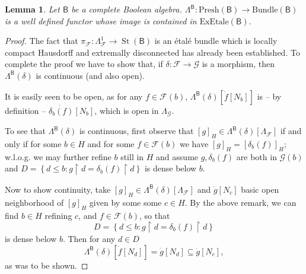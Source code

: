 \documentclass[11pt]{amsart}
\newcommand{\F}{\mathcal{F}}
\newcommand{\G}{\mathcal{G}}
\newcommand{\Presh}{\textrm{Presh}}
\newcommand{\bundle}{\textrm{Bundle}}
\newcommand{\exetale}{\textrm{ExEtale}}
\theoremstyle{plain}
\newtheorem{lemma}[theorem]{Lemma}
\theoremstyle{definition}
\theoremstyle{plain}
\theoremstyle{remark}
\newcommand{\dSet}{\mathsf{Set}}
\DeclareMathOperator{\St}{St}
\newcommand{\bool}[1]{\mathsf{#1}}
\newcommand{\bp}[1]{\left\lbrace #1 \right\rbrace}
\newcommand{\0}{\mathsf{0}}
\renewcommand{\1}{\mathsf{1}}
\renewcommand{\2}{\mathsf{2}}
\theoremstyle{definition}
\begin{document}
\begin{lemma}\label{lem:JBundef}
Let $\bool{B}$ be a complete Boolean algebra.
$\Lambda^{\bool{B}}:\Presh(\bool{B})\to\bundle(\bool{B})$ is a well defined functor whose image is contained in $\exetale(\bool{B})$.
\end{lemma}


\begin{proof}
The fact that $\pi_\F:\Lambda^1_\F\to\St(\bool{B})$  is an \'etal\'e bundle  which is locally compact Hausdorff and extremally disconnected has already been established. 
To complete the proof
we have to show that, if $\delta:\F\to\G$ is a morphism, then $\Lambda^{\bool{B}}(\delta)$ is continuous (and also open).

It is easily seen to be open, as for any $f\in\F(b)$, $\Lambda^{\bool{B}}(\delta)[\dot{f}[N_b]]$ is
-- by definition -- $\dot{\delta_b(f)}[N_b]$, which is open in $\Lambda_\G$.

To see that $\Lambda^{\bool{B}}(\delta)$ is continuous, first observe that $[g]_{H}\in\Lambda^{\bool{B}}(\delta)[\Lambda_\F]$ 
if and only if for some $b\in H$ and for some $f\in \F(b)$ we have
$[g]_{H}=[\delta_b(f)]_{H}$; w.l.o.g. we may further refine $b$ still in $H$ and assume $g,\delta_b(f)$ are both in $\G(b)$ and $D=\bp{d\leq b: g\restriction d=\delta_b(f)\restriction d}$ is dense below $b$. 

Now to show continuity, 
take $[g]_{H}\in\Lambda^{\bool{B}}(\delta)[\Lambda_\F]$ and $\dot{g}[N_c]$ basic open neighborhood of $[g]_H$ given by some some $c\in H$.
By the above remark, we can find $b\in H$ refining $c$, and $f\in \F(b)$, so that 
\[
D=\bp{d\leq b: g\restriction d=\delta_b(f)\restriction d}
\] 
is dense below $b$. Then for any $d\in D$
\[
\Lambda^{\bool{B}}(\delta)[\dot{f}[N_d]]=\dot{g}[N_d]\subseteq\dot{g}[N_c],
\]
as was to be shown.
\end{proof}




\end{document}

